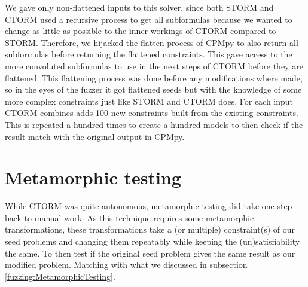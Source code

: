 We gave only non-flattened inputs to this solver, since both STORM and CTORM used a recursive process to get all subformulas because we wanted to change as little as possible to the inner workings of CTORM compared to STORM. Therefore, we hijacked the flatten process of CPMpy to also return all subformulas before returning the flattened constraints. This gave access to the more convoluted subformulas to use in the next steps of CTORM before they are flattened. This flattening process was done before any modifications where made, so in the eyes of the fuzzer it got flattened seeds but with the knowledge of some more complex constraints just like STORM and CTORM does. For each input CTORM combines adds 100 new constraints built from the existing constraints. This is repeated a hundred times to create a hundred models to then check if the result match with the original output in CPMpy.

%


\section{Metamorphic testing}
\label{impl:Meta}
While CTORM was quite autonomous, metamorphic testing did take one step back to manual work. As this technique requires some metamorphic transformations, these transformations take a (or multiple) constraint(s) of our seed problems and changing them repeatably while keeping the (un)satisfiability the same. To then test if the original seed problem gives the same result as our modified problem. Matching with what we discussed in subsection \ref{fuzzing:MetamorphicTesting}. 

